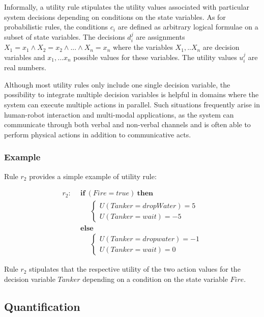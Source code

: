 Informally, a utility rule stipulates the utility values associated with particular system decisions depending on conditions on the state variables.  As for probabilistic rules, the conditions $c_i$ are defined as arbitrary logical formulae on a subset of state variables.  The decisions $d_i^j$ are assignments $X_1\!=\!x_1 \land X_2\!=\!x_2 \land ... \land X_n\!=\!x_n$ where the variables $X_1,..X_n$ are decision variables and $x_1,...x_n$ possible values for these variables. The utility values $u_i^j$ are real numbers. 

Although most utility rules only include one single decision variable, the possibility to integrate multiple decision variables is helpful in domains where the system can execute multiple actions in parallel. Such situations frequently arise in human-robot interaction and multi-modal applications, as the system can communicate through both verbal and non-verbal channels and is often able to perform physical actions in addition to communicative acts. 
 
\subsubsection*{Example}

Rule $r_2$ provides a simple example of utility rule:

\begin{align*}
r_2: \ \ & \textbf{if} \ (\mathit{Fire}\!=\!\mathit{true}) \ \textbf{then} \\
& \;\;\;\;\;  \begin{cases}
U(\mathit{Tanker}\!=\!\mathit{dropWater}) = 5 \\
U(\mathit{Tanker}\!=\!\mathit{wait}) = -5
\end{cases} \\
& \textbf{else} \\
& \;\;\;\;\; \begin{cases}
U (\mathit{Tanker}\!=\!\mathit{dropwater}) = -1 \\
U(\mathit{Tanker}\!=\!\mathit{wait}) = 0
\end{cases}
\end{align*}

Rule $r_2$ stipulates that the respective utility of the two action values for the decision variable $\mathit{Tanker}$ depending on a condition on the state variable $\mathit{Fire}$. 

\subsection{Quantification}
\label{sec:quantification}

